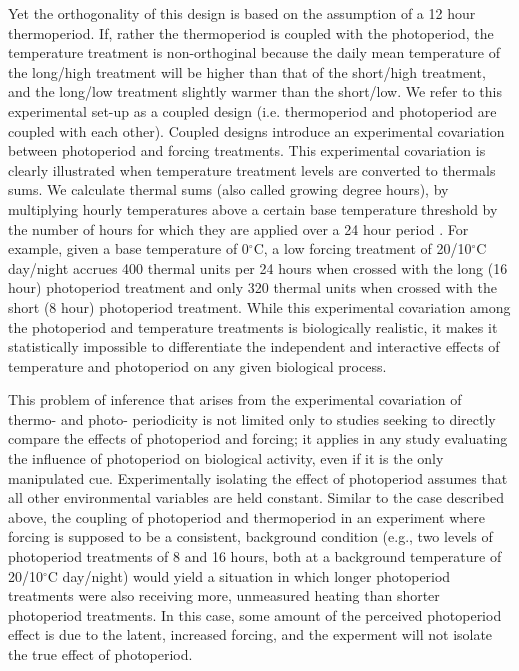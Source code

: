 \documentclass[11pt]{article}
\begin{document}
Yet the orthogonality of this design is based on the assumption of a 12 hour thermoperiod. If, rather the thermoperiod is coupled with the photoperiod, the temperature treatment is non-orthoginal because the daily mean temperature of the long/high treatment will be higher than that of the short/high treatment, and the long/low treatment slightly warmer than the short/low. We refer to this experimental set-up as a coupled design (i.e. thermoperiod and photoperiod are coupled with each other).  %
Coupled designs introduce an experimental covariation between photoperiod and forcing treatments. This experimental covariation is clearly illustrated when temperature treatment levels are converted to thermals sums. We calculate thermal sums (also called growing degree hours), by multiplying hourly temperatures above a certain base temperature threshold by the number of hours for which they are applied over a 24 hour period \citep{Parent:2019ug}. For example, given a base temperature of 0$^{\circ}$C, a low forcing treatment of 20/10$^{\circ}$C day/night accrues 400 thermal units per 24 hours  when crossed with the long (16 hour) photoperiod treatment and only 320 thermal units when crossed with the short (8 hour) photoperiod treatment. While this experimental covariation among the photoperiod and temperature treatments is biologically realistic, it makes it statistically impossible to differentiate the independent and interactive effects of temperature and photoperiod on any given biological process.

This problem of inference that arises from the experimental covariation of thermo- and photo- periodicity is not limited only to studies seeking to directly compare the effects of photoperiod and forcing; it applies in any study evaluating the influence of photoperiod on biological activity, even if it is the only manipulated cue. Experimentally isolating the effect of photoperiod assumes that all other environmental variables are held constant.  Similar to the case described above, %
the coupling of photoperiod and thermoperiod in an experiment where forcing is supposed to be a consistent, background condition (e.g., two levels of photoperiod treatments of 8 and 16 hours, both at a background temperature of 20/10$^{\circ}$C day/night) would yield a situation in which longer photoperiod treatments were also receiving more, unmeasured heating than shorter photoperiod treatments. In this case, some amount of the perceived photoperiod effect is due to the latent, increased forcing, and the experment will not isolate the true effect of photoperiod.
\end{document}
